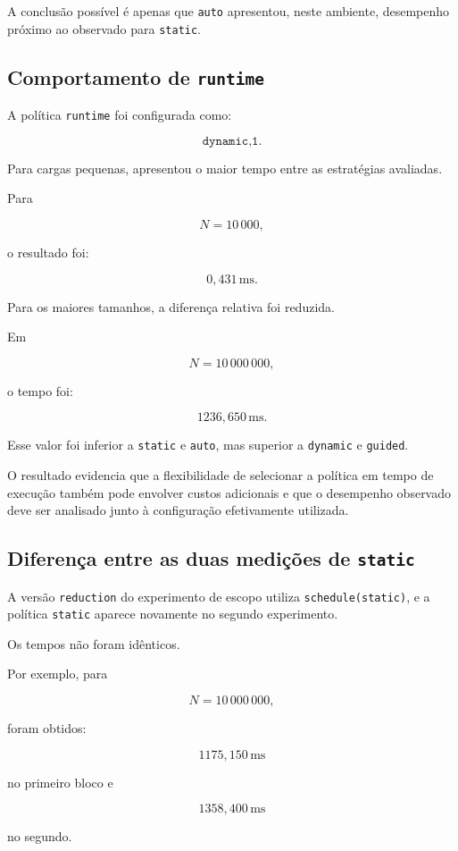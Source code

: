 A conclusão possível é apenas que \texttt{auto} apresentou, neste ambiente,
desempenho próximo ao observado para \texttt{static}.


\subsection{Comportamento de \texttt{runtime}}

A política \texttt{runtime} foi configurada como:

\[
\texttt{dynamic,1}.
\]

Para cargas pequenas, apresentou o maior tempo entre as estratégias
avaliadas.

Para

\[
N=10\,000,
\]

o resultado foi:

\[
0,431\,\mathrm{ms}.
\]

Para os maiores tamanhos, a diferença relativa foi reduzida.

Em

\[
N=10\,000\,000,
\]

o tempo foi:

\[
1236,650\,\mathrm{ms}.
\]

Esse valor foi inferior a \texttt{static} e \texttt{auto}, mas superior a
\texttt{dynamic} e \texttt{guided}.

O resultado evidencia que a flexibilidade de selecionar a política em tempo
de execução também pode envolver custos adicionais e que o desempenho
observado deve ser analisado junto à configuração efetivamente utilizada.


\subsection{Diferença entre as duas medições de \texttt{static}}

A versão \texttt{reduction} do experimento de escopo utiliza
\texttt{schedule(static)}, e a política \texttt{static} aparece novamente no
segundo experimento.

Os tempos não foram idênticos.

Por exemplo, para

\[
N=10\,000\,000,
\]

foram obtidos:

\[
1175,150\,\mathrm{ms}
\]

no primeiro bloco e

\[
1358,400\,\mathrm{ms}
\]

no segundo.

